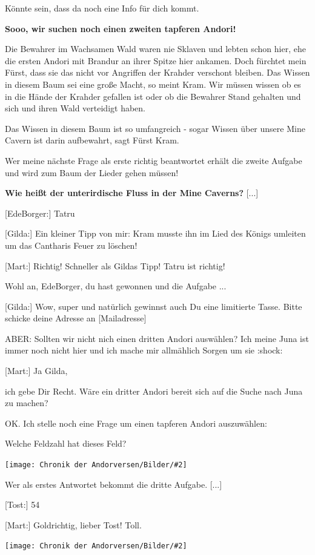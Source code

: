 \documentclass[10pt, a4paper, oneside]{book}
\newcommand{\bildmitts}[2][height=0.32\textwidth,width=0.48\textwidth,keepaspectratio]{%
    \begin{center}
        \texttt{[image: Chronik der Andorversen/Bilder/\#2]}
    \end{center}
}
\begin{document}
\begin{multicols}{2}
Könnte sein, dass da noch eine Info für dich kommt.

\textbf{Sooo, wir suchen noch einen zweiten tapferen Andori!}

Die Bewahrer im Wachsamen Wald waren nie Sklaven und lebten schon hier, ehe die ersten Andori mit Brandur an ihrer Spitze hier ankamen. Doch fürchtet mein Fürst, dass sie das nicht vor Angriffen der Krahder verschont bleiben. Das Wissen in diesem Baum sei eine große Macht, so meint Kram. Wir müssen wissen ob es in die Hände der Krahder gefallen ist oder ob die Bewahrer Stand gehalten und sich und ihren Wald verteidigt haben.

Das Wissen in diesem Baum ist so umfangreich - sogar Wissen über unsere Mine Cavern ist darin aufbewahrt, sagt Fürst Kram.

Wer meine nächste Frage als erste richtig beantwortet erhält die zweite Aufgabe und wird zum Baum der Lieder gehen müssen!

\textbf{Wie heißt der unterirdische Fluss in der Mine Caverns?} [...]

[EdeBorger:] Tatru

[Gilda:] Ein kleiner Tipp von mir: Kram musste ihn im Lied des Königs umleiten um das Cantharis Feuer zu löschen!

[Mart:] Richtig! Schneller als Gildas Tipp! Tatru ist richtig!

Wohl an, EdeBorger, du hast gewonnen und die Aufgabe ...

[Gilda:] Wow, super und natürlich gewinnst auch Du eine limitierte Tasse. Bitte schicke
deine Adresse an [Mailadresse]

ABER: Sollten wir nicht nich einen dritten Andori auswählen? Ich meine Juna ist immer noch nicht hier und ich mache mir allmählich Sorgen um sie :shock:

[Mart:] Ja Gilda,

ich gebe Dir Recht. Wäre ein dritter Andori bereit sich auf die Suche nach Juna zu machen?

OK. Ich stelle noch eine Frage um einen tapferen Andori auszuwählen:

Welche Feldzahl hat dieses Feld?

\bildmitts{AA2016 Treffen mit Mart und Juna 7.jpeg}

Wer als erstes Antwortet bekommt die dritte Aufgabe. [...]

[Tost:] 54

[Mart:] Goldrichtig, lieber Tost! Toll.

\bildmitts{AA2016 Treffen mit Mart und Juna 8.jpeg}


\end{multicols}
\end{document}
